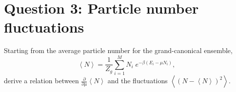 \documentclass[12 pt]{article} %
\newcommand{\be}{\ensuremath{\beta} }
\newcommand{\vev}[1]{\ensuremath{\left\langle #1 \right\rangle} }
\newcommand{\pderiv}[2]{\ensuremath{\frac{\partial #1}{\partial #2}} }
\newcommand{\showmarks}[1]{\rightline{\texttt{[#1 marks]}}} %
\begin{document}
\vfill
\section*{Question 3: Particle number fluctuations}
Starting from the average particle number for the grand-canonical ensemble,
\begin{equation*}
  \vev{N} = \frac{1}{Z_g} \sum_{i = 1}^M N_i \; e^{-\be (E_i - \mu N_i)},
\end{equation*}
derive a relation between $\displaystyle \pderiv{}{\mu} \vev{N}$ and the fluctuations $\vev{\left(N - \vev{N}\right)^2}$.

\showmarks{6}



\end{document}
